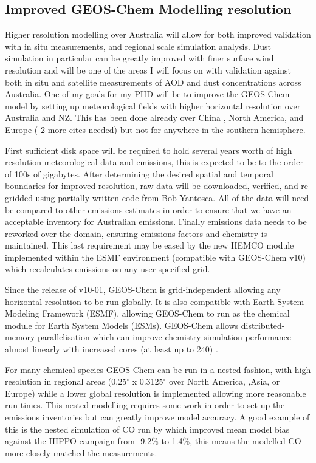 \subsection{Improved GEOS-Chem Modelling resolution}

Higher resolution modelling over Australia will allow for both improved validation with in situ measurements, and regional scale simulation analysis. 
Dust simulation in particular can be greatly improved with finer surface wind resolution and will be one of the areas I will focus on with validation against both in situ and satellite measurements of AOD and dust concentrations across Australia.
One of my goals for my PHD will be to improve the GEOS-Chem model by setting up meteorological fields with higher horizontal resolution over Australia and NZ.
This has been done already over China \cite{Chen_2009}, North America, and Europe ( 2 more cites needed) but not for anywhere in the southern hemisphere.

First sufficient disk space will be required to hold several years worth of high resolution meteorological data and emissions, this is expected to be to the order of 100s of gigabytes.
After determining the desired spatial and temporal boundaries for improved resolution, raw data will be downloaded, verified, and re-gridded using partially written code from Bob Yantosca.
All of the data will need be compared to other emissions estimates in order to ensure that we have an acceptable inventory for Australian emissions.
Finally emissions data needs to be reworked over the domain, ensuring emissions factors and chemistry is maintained.
This last requirement may be eased by the new HEMCO module implemented within the ESMF environment (compatible with GEOS-Chem v10) which recalculates emissions on any user specified grid.
  
Since the release of v10-01, GEOS-Chem is grid-independent allowing any horizontal resolution to be run globally. 
It is also compatible with Earth System Modeling Framework (ESMF), allowing GEOS-Chem to run as the chemical module for Earth System Models (ESMs). 
GEOS-Chem allows distributed-memory parallelisation which can improve chemistry simulation performance almost linearly with increased cores (at least up to 240) \cite{Long_2015}.

For many chemical species GEOS-Chem can be run in a nested fashion, with high resolution in regional areas (0.25$^{\circ}$ x 0.3125$^{\circ}$ over North America, ,Asia, or Europe) while a lower global resolution is implemented allowing more reasonable run times.
This nested modelling requires some work in order to set up the emissions inventories but can greatly improve model accuracy.
A good example of this is the nested simulation of CO run by \citet{Yan_2014} which improved mean model bias against the HIPPO campaign from -9.2\% to 1.4\%, this means the modelled CO more closely matched the measurements.

